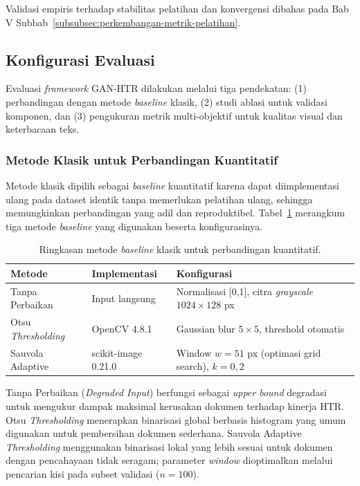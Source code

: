 Validasi empiris terhadap stabilitas pelatihan dan konvergensi dibahas pada Bab V Subbab~\ref{subsubsec:perkembangan-metrik-pelatihan}.

\subsection{Konfigurasi Evaluasi}
\label{subsec:konfigurasi-evaluasi}

Evaluasi \textit{framework} GAN-HTR dilakukan melalui tiga pendekatan: (1) perbandingan dengan metode \textit{baseline} klasik, (2) studi ablasi untuk validasi komponen, dan (3) pengukuran metrik multi-objektif untuk kualitas visual dan keterbacaan teks.

\subsubsection{Metode Klasik untuk Perbandingan Kuantitatif}

Metode klasik dipilih sebagai \textit{baseline} kuantitatif karena dapat diimplementasi ulang pada dataset identik tanpa memerlukan pelatihan ulang, sehingga memungkinkan perbandingan yang adil dan reproduktibel. Tabel~\ref{tab:metode-baseline} merangkum tiga metode \textit{baseline} yang digunakan beserta konfigurasinya.

\begin{table}[H]
  \caption[Ringkasan metode \textit{baseline} klasik]{Ringkasan metode \textit{baseline} klasik untuk perbandingan kuantitatif.}
  \label{tab:metode-baseline}
  \small

  \renewcommand{\arraystretch}{1.3}
  \begin{tabular}{|l|p{3.5cm}|p{6.5cm}|}
    \hline
    \textbf{Metode} & \textbf{Implementasi} & \textbf{Konfigurasi} \\
    \hline
    Tanpa Perbaikan & Input langsung & Normalisasi [0,1], citra \textit{grayscale} $1024 \times 128$ px \\
    \hline
    Otsu \textit{Thresholding} & OpenCV 4.8.1 & Gaussian blur $5\times5$, threshold otomatis \\
    \hline
    Sauvola Adaptive & scikit-image 0.21.0 & Window $w=51$ px (optimasi grid search), $k=0,2$ \\
    \hline
  \end{tabular}
\end{table}

Tanpa Perbaikan (\textit{Degraded Input}) berfungsi sebagai \textit{upper bound} degradasi untuk mengukur dampak maksimal kerusakan dokumen terhadap kinerja HTR. Otsu \textit{Thresholding} menerapkan binarisasi global berbasis histogram yang umum digunakan untuk pembersihan dokumen sederhana. Sauvola Adaptive \textit{Thresholding} menggunakan binarisasi lokal yang lebih sesuai untuk dokumen dengan pencahayaan tidak seragam; parameter \textit{window} dioptimalkan melalui pencarian kisi pada subset validasi ($n=100$).

